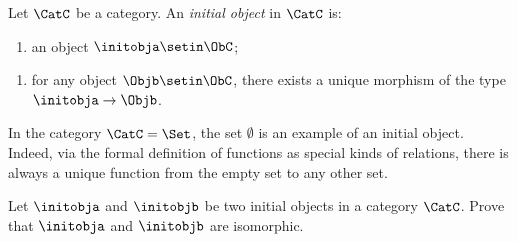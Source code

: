 

\begin{ctdefinition}
Let $\CatC$ be a category. An \emph{initial object} in $\CatC$ is: 

\constit
\begin{enumerate}
\item an object $\initobja \setin \ObC$; 
\end{enumerate}
\condit
\begin{enumerate}
\item for any object $\Objb \setin \ObC$, there exists a unique morphism of the type $\initobja \to \Objb$. 
\end{enumerate}
\end{ctdefinition}

\begin{example}
In the category $\CatC = \Set$, the set $\emptyset$ is an example of an initial object. Indeed, via the formal definition of functions as special kinds of relations, there is always a unique function from the empty set to any other set. 
\end{example}



\begin{gradedexercise}
Let $\initobja$ and $\initobjb$ be two initial objects in a category $\CatC$.  Prove that $\initobja$ and $\initobjb$ are isomorphic.  
\end{gradedexercise}


